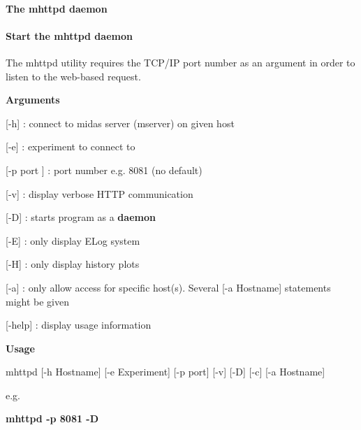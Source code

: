 \par
 

\label{index_end}
\hypertarget{index_end}{}
 \paragraph{The mhttpd daemon}\label{RC_mhttpd_utility}
\label{RC_mhttpd_utility_idx_mhttpd-utility}
\hypertarget{RC_mhttpd_utility_idx_mhttpd-utility}{}


\par
 \hypertarget{RC_mhttpd_utility_RC_mhttpd_Usage}{}\paragraph{Start the mhttpd daemon}\label{RC_mhttpd_utility_RC_mhttpd_Usage}
The mhttpd utility requires the TCP/IP port number as an argument in order to listen to the web-\/based request.


\begin{DoxyItemize}
\item {\bfseries  Arguments }
\end{DoxyItemize}


\begin{DoxyItemize}
\item \mbox{[}-\/h\mbox{]} : connect to midas server (mserver) on given host
\item \mbox{[}-\/e\mbox{]} : experiment to connect to
\item \mbox{[}-\/p port \mbox{]} : port number e.g. 8081 (no default)
\item \mbox{[}-\/v\mbox{]} : display verbose HTTP communication
\item \mbox{[}-\/D\mbox{]} : starts program as a {\bfseries daemon} 
\item \mbox{[}-\/E\mbox{]} : only display ELog system
\item \mbox{[}-\/H\mbox{]} : only display history plots
\item \mbox{[}-\/a\mbox{]} : only allow access for specific host(s). Several \mbox{[}-\/a Hostname\mbox{]} statements might be given
\item \mbox{[}-\/help\mbox{]} : display usage information
\end{DoxyItemize}


\begin{DoxyItemize}
\item {\bfseries  Usage } \par
 mhttpd \mbox{[}-\/h Hostname\mbox{]} \mbox{[}-\/e Experiment\mbox{]} \mbox{[}-\/p port\mbox{]} \mbox{[}-\/v\mbox{]} \mbox{[}-\/D\mbox{]} \mbox{[}-\/c\mbox{]} \mbox{[}-\/a Hostname\mbox{]} \par
e.g. \par
 {\bfseries mhttpd -\/p 8081 -\/D }
\end{DoxyItemize}

